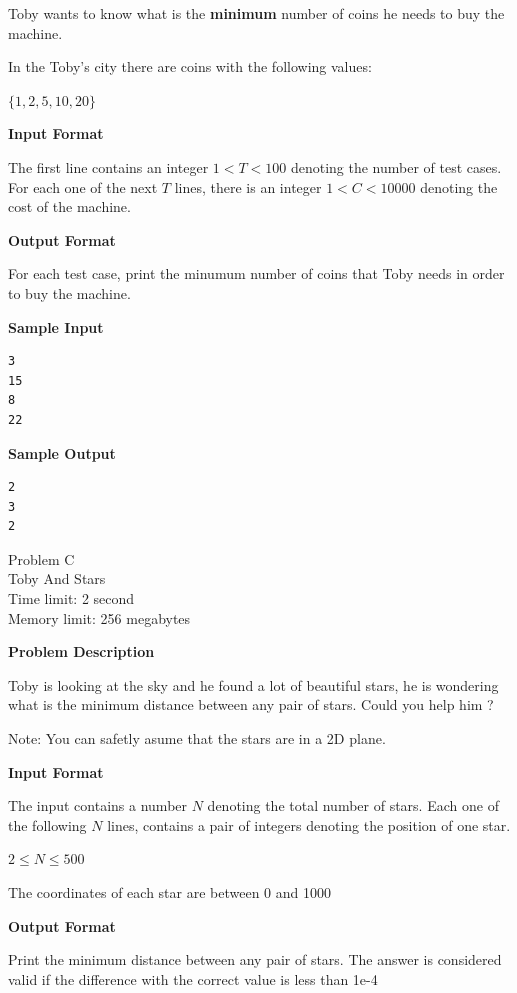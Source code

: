 \documentclass[11pt]{article}
\begin{document}
Toby wants to know what is the \textbf{minimum} number of coins he needs to buy the machine.

In the Toby's city there are coins with the following values:

$\{1, 2, 5, 10, 20\}$


\textbf{\large Input Format}

The first line contains an integer $1 < T < 100$ denoting the number of test cases. For each
one of the next $T$ lines, there is an integer $1 < C < 10000$ denoting the cost of the machine.

\textbf{\large Output Format}

For each test case, print the minumum number of coins that Toby needs in order
to buy the machine.

\textbf{\large Sample Input}

\begin{verbatim}
3
15
8
22
\end{verbatim}

\textbf{\large Sample Output}

\begin{verbatim}
2
3
2
\end{verbatim}

\newpage
        \begin{center}
            {\LARGE Problem C}\\
            {\Large Toby And Stars}\\
            {Time limit: 2 second}\\
            {Memory limit: 256 megabytes}
        \end{center}\textbf{\large Problem Description}

Toby is looking at the sky and he found a lot of beautiful stars, he is
wondering what is the minimum distance between any pair of stars. Could you
help him ?

Note: You can safetly asume that the stars are in a 2D plane.

\textbf{\large Input Format}

The input contains a number $N$ denoting the total number of stars. Each one of
the following $N$ lines, contains a pair of integers denoting the position of
one star.

$2 \le N \le 500$

The coordinates of each star are between 0 and 1000

\textbf{\large Output Format}

Print the minimum distance between any pair of stars. The answer is considered
valid if the difference with the correct value is less than 1e-4
\end{document}
